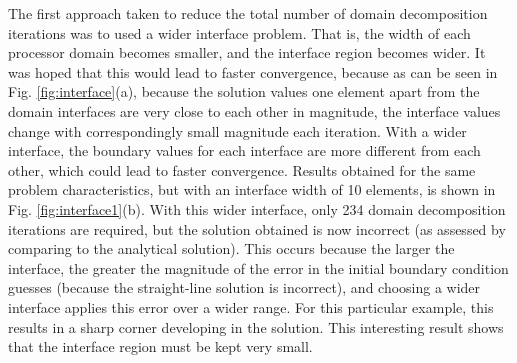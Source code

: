 \documentclass[10pt]{article}
\begin{document}
The first approach taken to reduce the total number of domain decomposition iterations was to used a wider interface problem. That is, the width of each processor domain becomes smaller, and the interface region becomes wider. It was hoped that this would lead to faster convergence, because as can be seen in Fig. \ref{fig:interface}(a), because the solution values one element apart from the domain interfaces are very close to each other in magnitude, the interface values change with correspondingly small magnitude each iteration. With a wider interface, the boundary values for each interface are more different from each other, which could lead to faster convergence. Results obtained for the same problem characteristics, but with an interface width of 10 elements, is shown in Fig. \ref{fig:interface1}(b). With this wider interface, only 234 domain decomposition iterations are required, but the solution obtained is now incorrect (as assessed by comparing to the analytical solution). This occurs because the larger the interface, the greater the magnitude of the error in the initial boundary condition guesses (because the straight-line solution is incorrect), and choosing a wider interface applies this error over a wider range. For this particular example, this results in a sharp corner developing in the solution. This interesting result shows that the interface region must be kept very small. 
\end{document}

